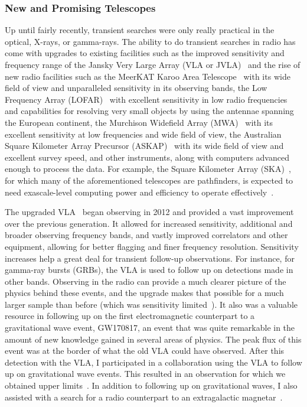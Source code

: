 \documentclass[12pt]{article}
\begin{document}
\subsubsection{New and Promising Telescopes}
Up until fairly recently, transient searches were only really practical in the optical, X-rays, or gamma-rays. The ability to do transient searches in radio has come with upgrades to existing facilities such as the improved sensitivity and frequency range of the Jansky Very Large Array (VLA or JVLA)~\citep{2011ApJ...739L...1P} and the rise of new radio facilities such as the MeerKAT Karoo Area Telescope~\citep{2016mks..confE...1J} with its wide field of view and unparalleled sensitivity in its observing bands, the Low Frequency Array (LOFAR)~\citep{2013A&A...556A...2V} with excellent sensitivity in low radio frequencies and capabilities for resolving very small objects by using the antennae spanning the European continent, the Murchison Widefield Array (MWA)~\citep{2013PASA...30....7T} with its excellent sensitivity at low frequencies and wide field of view, the Australian Square Kilometer Array Precursor (ASKAP)~\citep{2014PASA...31...41H} with its wide field of view and excellent survey speed, and other instruments, along with computers advanced enough to process the data. For example, the Square Kilometer Array (SKA)~\citep{2009IEEEP..97.1482D}, for which many of the aforementioned telescopes are pathfinders, is expected to need exascale-level computing power and efficiency to operate effectively~\citep{doi:10.1177/1094342014549059}. 

The upgraded VLA~\citep{2011ApJ...739L...1P} began observing in 2012 and provided a vast improvement over the previous generation. It allowed for increased sensitivity, additional and broader observing frequency bands, and vastly improved correlators and other equipment, allowing for better flagging and finer frequency resolution. Sensitivity increases help a great deal for transient follow-up observations. For instance, for gamma-ray bursts (GRBs), the VLA is used to follow up on detections made in other bands. Observing in the radio can provide a much clearer picture of the physics behind these events, and the upgrade makes that possible for a much larger sample than before (which was sensitivity limited~\citep{Chandra_2012}). It also was a valuable resource in following up on the first electromagnetic counterpart to a gravitational wave event, GW170817, an event that was quite remarkable in the amount of new knowledge gained in several areas of physics. The peak flux of this event was at the border of what the old VLA could have observed. After this detection with the VLA, I participated in a collaboration using the VLA to follow up on gravitational wave events. This resulted in an observation for which we obtained upper limits~\citep{2019GCN.26527....1C}. In addition to following up on gravitational waves, I also assisted with a search for a radio counterpart to an extragalactic magnetar~\citep{2021Natur.589..207R}.
\end{document}
